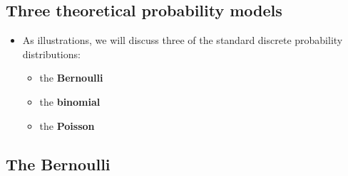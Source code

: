 \documentclass[11pt]{article}
\begin{document}
\subsection{Three theoretical probability models}

\begin{itemize}
\item As illustrations, we will discuss three of the standard discrete
probability distributions:

\begin{itemize}
\item the \textbf{Bernoulli}

\item the \textbf{binomial}

\item the \textbf{Poisson}
\end{itemize}
\end{itemize}

\subsection{The Bernoulli}
\end{document}

